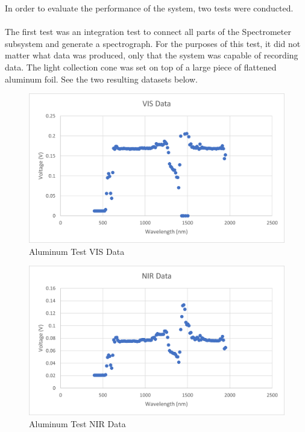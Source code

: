 In order to evaluate the performance of the system, two tests were conducted.

\paragraph{} The first test was an integration test to connect all parts of the Spectrometer subsystem and generate a spectrograph. For the purposes of this test, it did not matter what data was produced, only that the system was capable of recording data. The light collection cone was set on top of a large piece of flattened aluminum foil. See the two resulting datasets below.

\begin{figure}[H]
    \caption{Aluminum Test VIS Data}
    \centering
    \includegraphics[scale=1]{images/Aluminum VIS Data.png}
\end{figure}

\begin{figure}[H]
    \caption{Aluminum Test NIR Data}
    \centering
    \includegraphics[scale=1]{images/Aluminum NIR Data.png}
\end{figure}

